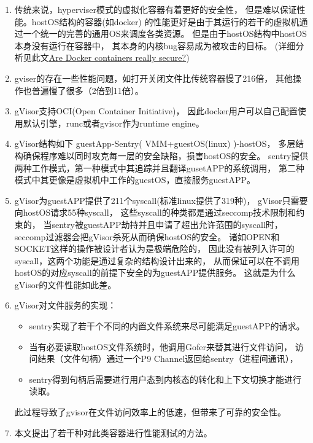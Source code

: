 \documentclass[AutoFakeBold,a4paper]{ctexart}
\begin{document}
\begin{enumerate}
    \item 传统来说，hyperviser模式的虚拟化容器有着更好的安全性，
    但是难以保证性能。hostOS结构的容器(如docker)
    的性能更好是由于其运行的若干的虚拟机通过一个统一的完善的通用OS来调度各类资源。
    但是由于hostOS结构中hostOS本身没有运行在容器中，
    其本身的内核bug容易成为被攻击的目标。 
    (详细分析见此文\href{https://opensource.com/business/14/7/docker-security-selinux}
    {Are Docker containers really secure?}\cite{DanielJDocker}) 
    
    \item gviser的存在一些性能问题，如打开关闭文件比传统容器慢了216倍，
    其他操作也普遍慢了很多（2倍到11倍）。
    \item gVisor支持OCI(Open Container Initiative)，
    因此docker用户可以自己配置使用默认引擎，runc或者gvisor作为runtime engine。
    \item gVisor结构如下 guestApp-Sentry( VMM+guestOS(linux) )-hostOS，
    多层结构确保程序难以同时攻克每一层的安全缺陷，损害hostOS的安全。
    sentry提供两种工作模式，第一种模式中其追踪并且翻译gusetAPP的系统调用，
    第二种模式中其更像是虚拟机中工作的guestOS，直接服务guestAPP。
    \item gVisor为guestAPP提供了211个syscall(标准linux提供了319种)，
    gVisor只需要向hostOS请求55种syscall，
    这些syscall的种类都是通过seccomp技术限制和约束的，
    当sentry被guestAPP劫持并且申请了超出允许范围的syscall时，
    seccomp过滤器会把gVisor杀死从而确保hostOS的安全。
    诸如OPEN和SOCKET这样的操作被设计者认为是极端危险的，
    因此没有被列入许可的syscall，这两个功能是通过复杂的结构设计出来的，
    从而保证可以在不调用hostOS的对应syscall的前提下安全的为guestAPP提供服务。
    这就是为什么gVisor的文件性能如此差。
    \item gVisor对文件服务的实现：
    \begin{itemize}
        \item sentry实现了若干个不同的内置文件系统来尽可能满足guestAPP的请求。
        \item 当有必要读取hostOS文件系统时，他调用Gofer来替其进行文件访问，
        访问结果（文件句柄）通过一个P9 Channel返回给sentry（进程间通讯），
        
        \item sentry得到句柄后需要进行用户态到内核态的转化和上下文切换才能进行读取。
    \end{itemize}
    此过程导致了gvisor在文件访问效率上的低速，但带来了可靠的安全性。
    
    \item 本文提出了若干种对此类容器进行性能测试的方法。
\end{enumerate}




\end{document}
